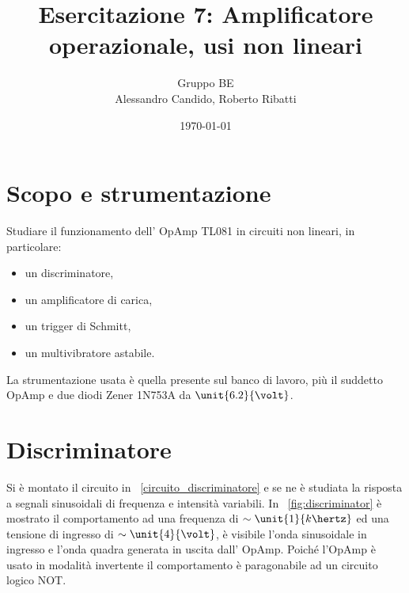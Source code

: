 \documentclass[10pt,a4paper]{article}
\title{Esercitazione 7: Amplificatore operazionale, usi non lineari}
\author{Gruppo BE \\ Alessandro Candido, Roberto Ribatti}
\date{\today}
\begin{document}
\maketitle

\section{Scopo e strumentazione}

Studiare il funzionamento dell’ OpAmp TL081 in circuiti non lineari, in particolare:
\begin{itemize}
\item un discriminatore,
\item un amplificatore di carica,
\item un trigger di Schmitt,
\item un multivibratore astabile.
\end{itemize}

La strumentazione usata è quella presente sul banco di lavoro, più il suddetto OpAmp e due diodi Zener 1N753A da $\unit{6.2}{\volt}$.

\section{Discriminatore}
Si è montato il circuito in \figurename{~\ref{circuito_discriminatore}} e se ne è studiata la risposta a segnali sinusoidali di frequenza e intensità variabili. In \figurename{~\ref{fig:discriminator}} è mostrato il comportamento ad una frequenza di $\sim \unit{1}{k\hertz}$ ed una tensione di ingresso di $\sim\unit{4}{\volt}$, è visibile l'onda sinusoidale in ingresso e l'onda quadra generata in uscita dall' OpAmp. Poiché l'OpAmp è usato in modalità invertente il comportamento è paragonabile ad un circuito logico NOT.
\end{document}
